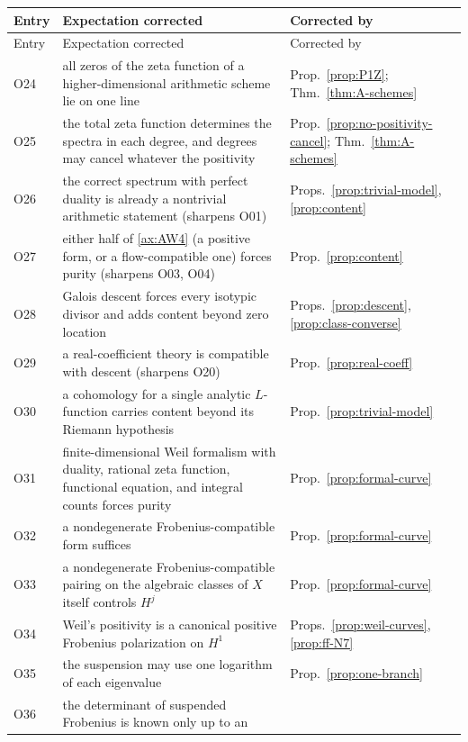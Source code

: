 \documentclass[11pt]{amsart}
\theoremstyle{plain}
\theoremstyle{definition}
\theoremstyle{remark}
\numberwithin{equation}{section}
\begin{document}
\begin{longtable}{@{}l>{\raggedright\arraybackslash}p{}
>{\raggedright\arraybackslash}p{}@{}}
\toprule
Entry & Expectation corrected & Corrected by\\
\midrule
\endfirsthead
\toprule
Entry & Expectation corrected & Corrected by\\
\midrule
\endhead
\bottomrule
\endfoot
O24 & all zeros of the zeta function of a higher-dimensional arithmetic
  scheme lie on one line & Prop.~\ref{prop:P1Z};
  Thm.~\ref{thm:A-schemes}\\
O25 & the total zeta function determines the spectra in each degree,
  and degrees may cancel whatever the positivity &
  Prop.~\ref{prop:no-positivity-cancel}; Thm.~\ref{thm:A-schemes}\\
O26 & the correct spectrum with perfect duality is already a
  nontrivial arithmetic statement (sharpens O01) &
  Props.~\ref{prop:trivial-model}, \ref{prop:content}\\
O27 & either half of \ref{ax:AW4} (a positive form, or a
  flow-compatible one) forces purity (sharpens O03, O04) &
  Prop.~\ref{prop:content}\\
O28 & Galois descent forces every isotypic divisor and adds content
  beyond zero location & Props.~\ref{prop:descent},
  \ref{prop:class-converse}\\
O29 & a real-coefficient theory is compatible with descent (sharpens
  O20) & Prop.~\ref{prop:real-coeff}\\
O30 & a cohomology for a single analytic $L$-function carries content
  beyond its Riemann hypothesis & Prop.~\ref{prop:trivial-model}\\
O31 & finite-dimensional Weil formalism with duality, rational zeta
  function, functional equation, and integral counts forces purity &
  Prop.~\ref{prop:formal-curve}\\
O32 & a nondegenerate Frobenius-compatible form suffices &
  Prop.~\ref{prop:formal-curve}\\
O33 & a nondegenerate Frobenius-compatible pairing on the algebraic
  classes of $X$ itself controls $H^j$ & Prop.~\ref{prop:formal-curve}\\
O34 & Weil's positivity is a canonical positive Frobenius polarization
  on $H^1$ & Props.~\ref{prop:weil-curves}, \ref{prop:ff-N7}\\
O35 & the suspension may use one logarithm of each eigenvalue &
  Prop.~\ref{prop:one-branch}\\
O36 & the determinant of suspended Frobenius is known only up to an

\end{longtable}
\end{document}
